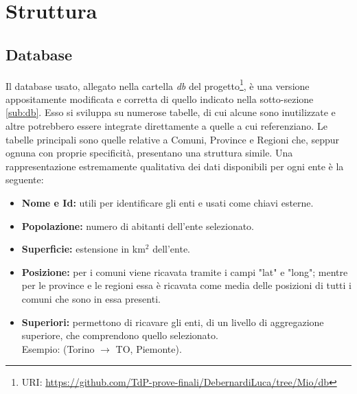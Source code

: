 \documentclass[a4paper, 12pt]{article}
\begin{document}
\newpage

\section{Struttura}

	\subsection{Database}
		
		Il database usato, allegato nella cartella \emph{db} del progetto\footnote{URI: \url{https://github.com/TdP-prove-finali/DebernardiLuca/tree/Mio/db}}, è una versione appositamente modificata e corretta di quello indicato nella sotto-sezione \vref{sub:db}.
		Esso si sviluppa su numerose tabelle, di cui alcune sono inutilizzate e altre potrebbero essere integrate direttamente a quelle a cui referenziano.
		Le tabelle principali sono quelle relative a Comuni, Province e Regioni che, seppur ognuna con proprie specificità, presentano una struttura simile.
		Una rappresentazione estremamente qualitativa dei dati disponibili per ogni ente è la seguente:
		\begin{itemize}
			\item \textbf{Nome e Id:} utili per identificare gli enti e usati come chiavi esterne.
			\item \textbf{Popolazione:} numero di abitanti dell'ente selezionato.
			\item \textbf{Superficie:} estensione in km$^{2}$ dell'ente.
			\item \textbf{Posizione:} per i comuni viene ricavata tramite i campi "lat" e "long"; mentre per le province e le regioni essa è ricavata come media delle posizioni di tutti i comuni che sono in essa presenti.
			\item \textbf{Superiori:} permettono di ricavare gli enti, di un livello di aggregazione superiore, che comprendono quello selezionato.\\
			Esempio: (Torino $\to$ TO, Piemonte).
		\end{itemize}
\end{document}
